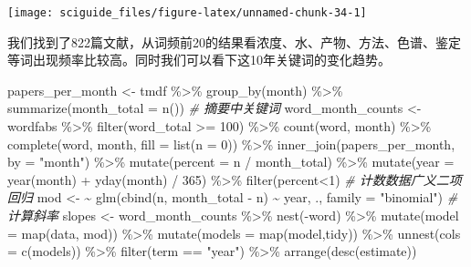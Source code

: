 \documentclass[]{tufte-book}
\newenvironment{Shaded}{}{}
\newcommand{\AttributeTok}[1]{\textcolor[rgb]{0.49,0.56,0.16}{#1}}
\newcommand{\CommentTok}[1]{\textcolor[rgb]{0.38,0.63,0.69}{\textit{#1}}}
\newcommand{\DecValTok}[1]{\textcolor[rgb]{0.25,0.63,0.44}{#1}}
\newcommand{\ErrorTok}[1]{\textcolor[rgb]{1.00,0.00,0.00}{\textbf{#1}}}
\newcommand{\FunctionTok}[1]{\textcolor[rgb]{0.02,0.16,0.49}{#1}}
\newcommand{\NormalTok}[1]{#1}
\newcommand{\OtherTok}[1]{\textcolor[rgb]{0.00,0.44,0.13}{#1}}
\newcommand{\SpecialCharTok}[1]{\textcolor[rgb]{0.25,0.44,0.63}{#1}}
\newcommand{\StringTok}[1]{\textcolor[rgb]{0.25,0.44,0.63}{#1}}
\begin{document}
\texttt{[image: sciguide\_files/figure-latex/unnamed-chunk-34-1]}

我们找到了822篇文献，从词频前20的结果看浓度、水、产物、方法、色谱、鉴定等词出现频率比较高。同时我们可以看下这10年关键词的变化趋势。

\begin{Shaded}
\begin{Highlighting}[]
\NormalTok{papers\_per\_month }\OtherTok{\textless{}{-}}\NormalTok{ tmdf }\SpecialCharTok{\%\textgreater{}\%}
  \FunctionTok{group\_by}\NormalTok{(month) }\SpecialCharTok{\%\textgreater{}\%}
  \FunctionTok{summarize}\NormalTok{(}\AttributeTok{month\_total =} \FunctionTok{n}\NormalTok{())}
\CommentTok{\# 摘要中关键词}
\NormalTok{word\_month\_counts }\OtherTok{\textless{}{-}}\NormalTok{ wordfabs }\SpecialCharTok{\%\textgreater{}\%}
  \FunctionTok{filter}\NormalTok{(word\_total }\SpecialCharTok{\textgreater{}=} \DecValTok{100}\NormalTok{) }\SpecialCharTok{\%\textgreater{}\%}
  \FunctionTok{count}\NormalTok{(word, month) }\SpecialCharTok{\%\textgreater{}\%}
  \FunctionTok{complete}\NormalTok{(word, month, }\AttributeTok{fill =} \FunctionTok{list}\NormalTok{(}\AttributeTok{n =} \DecValTok{0}\NormalTok{)) }\SpecialCharTok{\%\textgreater{}\%}
  \FunctionTok{inner\_join}\NormalTok{(papers\_per\_month, }\AttributeTok{by =} \StringTok{"month"}\NormalTok{) }\SpecialCharTok{\%\textgreater{}\%}
  \FunctionTok{mutate}\NormalTok{(}\AttributeTok{percent =}\NormalTok{ n }\SpecialCharTok{/}\NormalTok{ month\_total) }\SpecialCharTok{\%\textgreater{}\%}
  \FunctionTok{mutate}\NormalTok{(}\AttributeTok{year =} \FunctionTok{year}\NormalTok{(month) }\SpecialCharTok{+} \FunctionTok{yday}\NormalTok{(month) }\SpecialCharTok{/} \DecValTok{365}\NormalTok{) }\SpecialCharTok{\%\textgreater{}\%}
        \FunctionTok{filter}\NormalTok{(percent}\SpecialCharTok{\textless{}}\DecValTok{1}\NormalTok{)}
\CommentTok{\# 计数数据广义二项回归}
\NormalTok{mod }\OtherTok{\textless{}{-}} \ErrorTok{\textasciitilde{}} \FunctionTok{glm}\NormalTok{(}\FunctionTok{cbind}\NormalTok{(n, month\_total }\SpecialCharTok{{-}}\NormalTok{ n) }\SpecialCharTok{\textasciitilde{}}\NormalTok{ year, ., }\AttributeTok{family =} \StringTok{"binomial"}\NormalTok{)}
\CommentTok{\# 计算斜率}
\NormalTok{slopes }\OtherTok{\textless{}{-}}\NormalTok{ word\_month\_counts }\SpecialCharTok{\%\textgreater{}\%}
  \FunctionTok{nest}\NormalTok{(}\SpecialCharTok{{-}}\NormalTok{word) }\SpecialCharTok{\%\textgreater{}\%}
  \FunctionTok{mutate}\NormalTok{(}\AttributeTok{model =} \FunctionTok{map}\NormalTok{(data, mod)) }\SpecialCharTok{\%\textgreater{}\%}
  \FunctionTok{mutate}\NormalTok{(}\AttributeTok{models =} \FunctionTok{map}\NormalTok{(model,tidy)) }\SpecialCharTok{\%\textgreater{}\%}
  \FunctionTok{unnest}\NormalTok{(}\AttributeTok{cols =} \FunctionTok{c}\NormalTok{(models)) }\SpecialCharTok{\%\textgreater{}\%}
  \FunctionTok{filter}\NormalTok{(term }\SpecialCharTok{==} \StringTok{"year"}\NormalTok{) }\SpecialCharTok{\%\textgreater{}\%}
  \FunctionTok{arrange}\NormalTok{(}\FunctionTok{desc}\NormalTok{(estimate))}
\end{Highlighting}
\end{Shaded}
\end{document}
